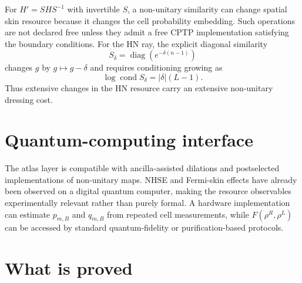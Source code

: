 \documentclass[11pt]{article}
\begin{document}
For $H'=SHS^{-1}$ with invertible $S$, a non-unitary similarity can change spatial skin resource because it changes the cell probability embedding. Such operations are not declared free unless they admit a free CPTP implementation satisfying the boundary conditions. For the HN ray, the explicit diagonal similarity
\[
S_\delta=\operatorname{diag}(e^{-\delta(n-1)})
\]
changes $g$ by $g\mapsto g-\delta$ and requires conditioning growing as
\[
\log\operatorname{cond}S_\delta=|\delta|(L-1).
\]
Thus extensive changes in the HN resource carry an extensive non-unitary dressing cost.

\section{Quantum-computing interface}

The atlas layer is compatible with ancilla-assisted dilations and postselected implementations of non-unitary maps. NHSE and Fermi-skin effects have already been observed on a digital quantum computer, making the resource observables experimentally relevant rather than purely formal. \cite{DigitalNHSE} A hardware implementation can estimate $p_{m,B}$ and $q_{m,B}$ from repeated cell measurements, while $F(\rho^R,\rho^L)$ can be accessed by standard quantum-fidelity or purification-based protocols.

\section{What is proved}
\end{document}
